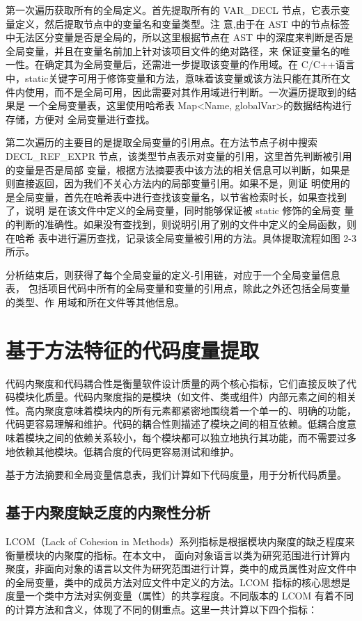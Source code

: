 第一次遍历获取所有的全局定义。首先提取所有的
VAR\_DECL 节点，它表示变量定义，然后提取节点中的变量名和变量类型。注
意,由于在 AST 中的节点标签中无法区分变量是否是全局的，所以这里根据节点在 AST
中的深度来判断是否是全局变量，并且在变量名前加上针对该项目文件的绝对路径，来
保证变量名的唯一性。在确定其为全局变量后，还需进一步提取该变量的作用域。在
C/C++语言中，static关键字可用于修饰变量和方法，意味着该变量或该方法只能在其所在文
件内使用，而不是全局可用，因此需要对其作用域进行判断。一次遍历提取到的结果是
一个全局变量表，这里使用哈希表 Map<Name, globalVar>的数据结构进行存储，方便对
全局变量进行查找。

第二次遍历的主要目的是提取全局变量的引用点。在方法节点子树中搜索
DECL\_REF\_EXPR 节点，该类型节点表示对变量的引用，这里首先判断被引用的变量是否是局部
变量，根据方法摘要表中该方法的相关信息可以判断，如果是则直接返回，因为我们不关心方法内的局部变量引用。如果不是，则证
明使用的是全局变量，首先在哈希表中进行查找该变量名，以节省检索时长，如果查找到了，说明
是在该文件中定义的全局变量，同时能够保证被 static 修饰的全局变
量的判断的准确性。如果没有查找到，则说明引用了别的文件中定义的全局函数，则在哈希
表中进行遍历查找，记录该全局变量被引用的方法。具体提取流程如图 2-3 所示。

分析结束后，则获得了每个全局变量的定义-引用链，对应于一个全局变量信息表，
包括项目代码中所有的全局变量和变量的引用点，除此之外还包括全局变量的类型、作
用域和所在文件等其他信息。

\section{基于方法特征的代码度量提取}

代码内聚度和代码耦合性是衡量软件设计质量的两个核心指标，它们直接反映了代
码模块化质量。代码内聚度指的是模块（如文件、类或组件）内部元素之间的相关性。高内聚度意味着模块内的所有元素都紧密地围绕着一个单一的、明确的功能，代码更容易理解和维护\cite{2014Service}。代码的耦合性则描述了模块之间的相互依赖。低耦合度意味着模块之间的依赖关系较小，每个模块都可以独立地执行其功能，而不需要过多地依赖其他模块。低耦合度的代码更容易测试和维护\cite{2013Ahe}。


基于方法摘要和全局变量信息表，我们计算如下代码度量，用于分析代码质量。


\subsection{基于内聚度缺乏度的内聚性分析}

LCOM（Lack of Cohesion in Methods）系列指标是根据模块内聚度的缺乏程度来衡量模块的内聚度的指标。在本文中，
面向对象语言以类为研究范围进行计算内聚度，非面向对象的语言以文件为研究范围进行计算，类中的成员属性对应文件中的全局变量，类中的成员方法对应文件中定义的方法。LCOM 指标的核心思想是度量一个类中方法对实例变量（属性）的共享程度。不同版本的 LCOM 有着不同的计算方法和含义，体现了不同的侧重点。这里一共计算以下四个指标：


